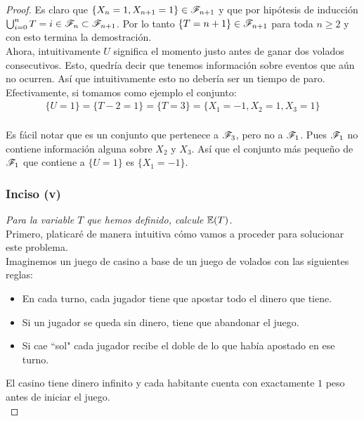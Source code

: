 \begin{proof}
			Es claro que $\{ X_n = 1, X_{n+1} = 1\} \in \mathscr{F}_{n + 1}$ y que por hipótesis de inducción
			$\bigcup_{i=0}^{n} {T = i} \in \mathscr{F}_n \subset \mathscr{F}_{n + 1}$. Por lo tanto
			$\{T = n + 1 \} \in \mathscr{F}_{n+1}$ para toda $n \geq 2$ y con esto termina la demostración.\\
			
		Ahora, intuitivamente $U$ significa el momento justo antes de ganar dos volados consecutivos.
		Esto, quedría decir que tenemos información sobre eventos que aún no ocurren. Así que intuitivamente
		esto no debería ser un tiempo de paro.\\
		
		Efectivamente, si tomamos como ejemplo el conjunto: 
			\begin{align}
				\{ U = 1 \} = \{ T - 2 = 1\} = \{ T = 3\} = \{X_1 = -1, X_2 = 1, X_3 = 1\}
			\end{align}		\\
				
		Es fácil notar que es un conjunto que pertenece a $\mathscr{F}_3$, pero no a $\mathscr{F}_1$. Pues $\mathscr{F}_1$
		no contiene información alguna sobre $X_2$ y $X_3$. Así que el conjunto más pequeño de $\mathscr{F}_1$ 
		que contiene a $\{ U = 1 \}$ es $\{ X_1 = -1 \}$.\\
	
	\subsubsection{Inciso (v)}	
	\emph
	{
		Para la variable $T$ que hemos definido, calcule $\mathbb{E}\! \left( T \right)$.\\
	}
		Primero, platicaré de manera intuitiva cómo vamos a proceder para solucionar este problema.\\
	
		Imaginemos un juego de casino a base de un juego de volados con las siguientes reglas:\\
		\begin{itemize}
				\item En cada turno, cada jugador tiene que apostar todo el dinero que tiene.
				\item Si un jugador se queda sin dinero, tiene que abandonar el juego.
				\item Si cae ``sol" cada jugador recibe el doble de lo que había apostado en ese turno.  
		\end{itemize}
	   
		\;El casino tiene dinero infinito y cada habitante cuenta con exactamente $1$ peso antes de
		iniciar el juego.\\
	   

\end{proof}
